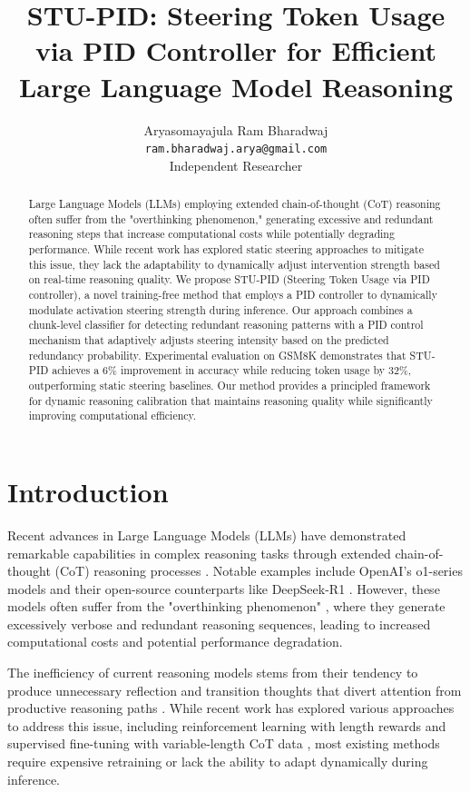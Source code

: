 \documentclass{article}
\title{STU-PID: Steering Token Usage via PID Controller for Efficient Large Language Model Reasoning}
\author{
  Aryasomayajula Ram Bharadwaj\\
  \texttt{ram.bharadwaj.arya@gmail.com}\\
  Independent Researcher
}
\begin{document}
\maketitle

\begin{abstract}
Large Language Models (LLMs) employing extended chain-of-thought (CoT) reasoning often suffer from the "overthinking phenomenon," generating excessive and redundant reasoning steps that increase computational costs while potentially degrading performance. While recent work has explored static steering approaches to mitigate this issue, they lack the adaptability to dynamically adjust intervention strength based on real-time reasoning quality. We propose STU-PID (Steering Token Usage via PID controller), a novel training-free method that employs a PID controller to dynamically modulate activation steering strength during inference. Our approach combines a chunk-level classifier for detecting redundant reasoning patterns with a PID control mechanism that adaptively adjusts steering intensity based on the predicted redundancy probability. Experimental evaluation on GSM8K demonstrates that STU-PID achieves a 6\% improvement in accuracy while reducing token usage by 32\%, outperforming static steering baselines. Our method provides a principled framework for dynamic reasoning calibration that maintains reasoning quality while significantly improving computational efficiency.
\end{abstract}

\section{Introduction}

Recent advances in Large Language Models (LLMs) have demonstrated remarkable capabilities in complex reasoning tasks through extended chain-of-thought (CoT) reasoning processes \cite{wei2022chain}. Notable examples include OpenAI's o1-series models and their open-source counterparts like DeepSeek-R1 \cite{guo2025deepseek}. However, these models often suffer from the "overthinking phenomenon" \cite{sui2025stop}, where they generate excessively verbose and redundant reasoning sequences, leading to increased computational costs and potential performance degradation.

The inefficiency of current reasoning models stems from their tendency to produce unnecessary reflection and transition thoughts that divert attention from productive reasoning paths \cite{chen2025seal}. While recent work has explored various approaches to address this issue, including reinforcement learning with length rewards and supervised fine-tuning with variable-length CoT data \cite{sui2025stop}, most existing methods require expensive retraining or lack the ability to adapt dynamically during inference.
\end{document}
